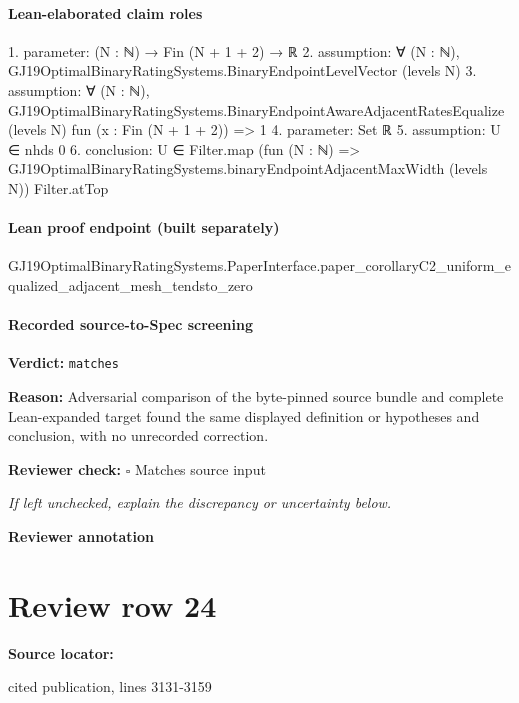 \documentclass[10pt]{article}
\newcommand{\reviewerbox}{%
  \par\noindent\fbox{\parbox{0.96\linewidth}{\rule{0pt}{0.38in}}}\par
}
\newcommand{\reviewmatch}[1]{%
  \par\noindent\textbf{Reviewer check:} $\square$\; #1\par
  \noindent\emph{If left unchecked, explain the discrepancy or uncertainty below.}\par
}
\begin{document}
\paragraph{Lean-elaborated claim roles}\begin{ReviewVerbatim}
1. parameter: (N : ℕ) → Fin (N + 1 + 2) → ℝ
2. assumption: ∀ (N : ℕ), GJ19OptimalBinaryRatingSystems.BinaryEndpointLevelVector (levels N)
3. assumption: ∀ (N : ℕ),
  GJ19OptimalBinaryRatingSystems.BinaryEndpointAwareAdjacentRatesEqualize (levels N) fun (x : Fin (N + 1 + 2)) => 1
4. parameter: Set ℝ
5. assumption: U ∈ nhds 0
6. conclusion: U ∈ Filter.map (fun (N : ℕ) => GJ19OptimalBinaryRatingSystems.binaryEndpointAdjacentMaxWidth (levels N)) Filter.atTop
\end{ReviewVerbatim}

\paragraph{Lean proof endpoint (built separately)}\begin{ReviewVerbatim}
GJ19OptimalBinaryRatingSystems.PaperInterface.paper_corollaryC2_uniform_equalized_adjacent_mesh_tendsto_zero
\end{ReviewVerbatim}

\paragraph{Recorded source-to-Spec screening}
\textbf{Verdict:} \texttt{matches}
\\
{\raggedright
\textbf{Reason:} Adversarial comparison of the byte-\allowbreak{}pinned source bundle and complete Lean-\allowbreak{}expanded target found the same displayed definition or hypotheses and conclusion, with no unrecorded correction.\allowbreak{}
\par}
\reviewmatch{Matches source input}
\noindent\textbf{Reviewer annotation}\par
\reviewerbox
\clearpage
\hypertarget{source-claim-6e85310ac4deebe8}{}
\section*{Review row 24}
\textbf{Source locator:} {\footnotesize\raggedright cited publication, lines 3131-\allowbreak{}3159\par}
\end{document}
